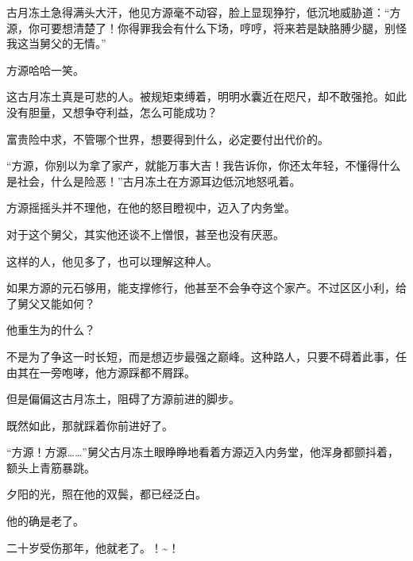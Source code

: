 \begin{this_body}
古月冻土急得满头大汗，他见方源毫不动容，脸上显现狰狞，低沉地威胁道：“方源，你可要想清楚了！你得罪我会有什么下场，哼哼，将来若是缺胳膊少腿，别怪我这当舅父的无情。”

方源哈哈一笑。

这古月冻土真是可悲的人。被规矩束缚着，明明水囊近在咫尺，却不敢强抢。如此没有胆量，又想争夺利益，怎么可能成功？

富贵险中求，不管哪个世界，想要得到什么，必定要付出代价的。

“方源，你别以为拿了家产，就能万事大吉！我告诉你，你还太年轻，不懂得什么是社会，什么是险恶！”古月冻土在方源耳边低沉地怒吼着。

方源摇摇头并不理他，在他的怒目瞪视中，迈入了内务堂。

对于这个舅父，其实他还谈不上憎恨，甚至也没有厌恶。

这样的人，他见多了，也可以理解这种人。

如果方源的元石够用，能支撑修行，他甚至不会争夺这个家产。不过区区小利，给了舅父又能如何？

他重生为的什么？

不是为了争这一时长短，而是想迈步最强之巅峰。这种路人，只要不碍着此事，任由其在一旁咆哮，他方源踩都不屑踩。

但是偏偏这古月冻土，阻碍了方源前进的脚步。

既然如此，那就踩着你前进好了。

“方源！方源……”舅父古月冻土眼睁睁地看着方源迈入内务堂，他浑身都颤抖着，额头上青筋暴跳。

夕阳的光，照在他的双鬓，都已经泛白。

他的确是老了。

二十岁受伤那年，他就老了。！\~{}！

\end{this_body}

